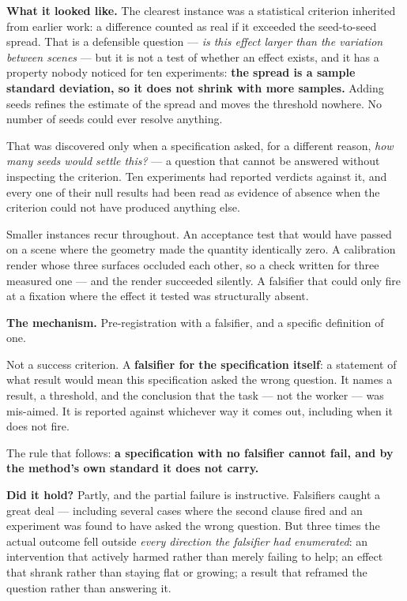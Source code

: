 \textbf{What it looked like.} The clearest instance was a statistical criterion inherited from earlier work: a difference counted as real if it exceeded the seed-to-seed spread. That is a defensible question --- \textit{is this effect larger than the variation between scenes} --- but it is not a test of whether an effect exists, and it has a property nobody noticed for ten experiments: \textbf{the spread is a sample standard deviation, so it does not shrink with more samples.} Adding seeds refines the estimate of the spread and moves the threshold nowhere. No number of seeds could ever resolve anything.

That was discovered only when a specification asked, for a different reason, \textit{how many seeds would settle this?} --- a question that cannot be answered without inspecting the criterion. Ten experiments had reported verdicts against it, and every one of their null results had been read as evidence of absence when the criterion could not have produced anything else.

Smaller instances recur throughout. An acceptance test that would have passed on a scene where the geometry made the quantity identically zero. A calibration render whose three surfaces occluded each other, so a check written for three measured one --- and the render succeeded silently. A falsifier that could only fire at a fixation where the effect it tested was structurally absent.

\textbf{The mechanism.} Pre-registration with a falsifier, and a specific definition of one.

Not a success criterion. A \textbf{falsifier for the specification itself}: a statement of what result would mean this specification asked the wrong question. It names a result, a threshold, and the conclusion that the task --- not the worker --- was mis-aimed. It is reported against whichever way it comes out, including when it does not fire.

The rule that follows: \textbf{a specification with no falsifier cannot fail, and by the method's own standard it does not carry.}

\textbf{Did it hold?} Partly, and the partial failure is instructive. Falsifiers caught a great deal --- including several cases where the second clause fired and an experiment was found to have asked the wrong question. But three times the actual outcome fell outside \textit{every direction the falsifier had enumerated}: an intervention that actively harmed rather than merely failing to help; an effect that shrank rather than staying flat or growing; a result that reframed the question rather than answering it.

